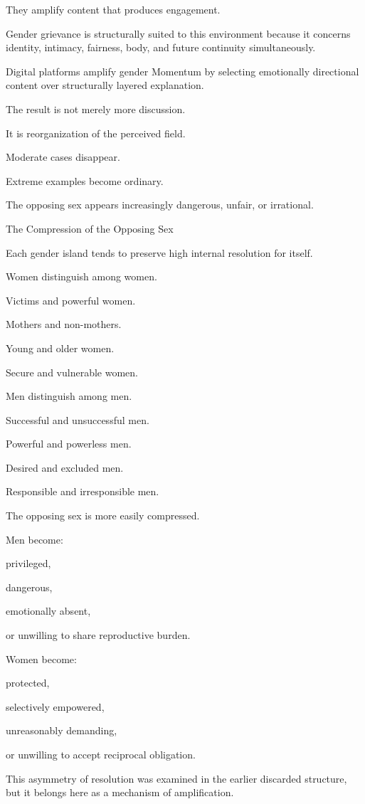 They amplify content that produces engagement.

Gender grievance is structurally suited to this environment because it concerns identity, intimacy, fairness, body, and future continuity simultaneously.

Digital platforms amplify gender Momentum by selecting emotionally directional content over structurally layered explanation.

The result is not merely more discussion.

It is reorganization of the perceived field.

Moderate cases disappear.

Extreme examples become ordinary.

The opposing sex appears increasingly dangerous, unfair, or irrational.

The Compression of the Opposing Sex

Each gender island tends to preserve high internal resolution for itself.

Women distinguish among women.

Victims and powerful women.

Mothers and non-mothers.

Young and older women.

Secure and vulnerable women.

Men distinguish among men.

Successful and unsuccessful men.

Powerful and powerless men.

Desired and excluded men.

Responsible and irresponsible men.

The opposing sex is more easily compressed.

Men become:

privileged,

dangerous,

emotionally absent,

or unwilling to share reproductive burden.

Women become:

protected,

selectively empowered,

unreasonably demanding,

or unwilling to accept reciprocal obligation.

This asymmetry of resolution was examined in the earlier discarded structure, but it belongs here as a mechanism of amplification.

